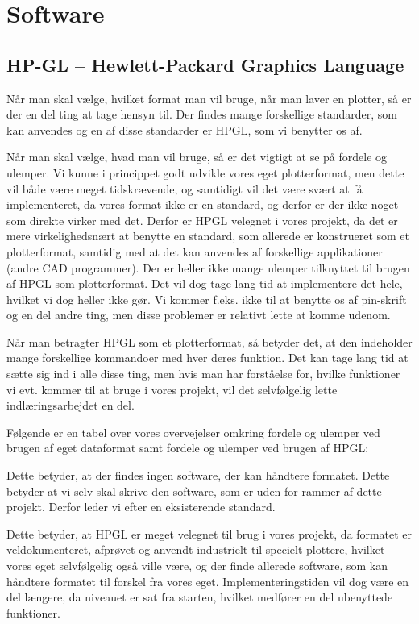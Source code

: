 \chapter{Software}


\section{HP-GL -- Hewlett-Packard Graphics Language}
Når man skal vælge, hvilket format man vil bruge, når man laver en plotter, så er der en del ting at tage hensyn til. Der findes mange forskellige standarder, som kan anvendes og en af disse standarder er HPGL, som vi benytter os af.


Når man skal vælge, hvad man vil bruge, så er det vigtigt at se på fordele og ulemper. Vi kunne i princippet godt udvikle vores eget plotterformat, men dette vil både være meget tidskrævende, og samtidigt vil det være svært at få implementeret, da vores format ikke er en standard, og derfor er der ikke noget som direkte virker med det. Derfor er HPGL velegnet i vores projekt, da det er mere virkelighedsnært at benytte en standard, som allerede er konstrueret som et plotterformat, samtidig med at det kan anvendes af forskellige applikationer (andre CAD programmer). Der er heller ikke mange ulemper tilknyttet til brugen af HPGL som plotterformat. Det vil dog tage lang tid at implementere det hele, hvilket vi dog heller ikke gør. Vi kommer f.eks. ikke til at benytte os af pin-skrift og en del andre ting, men disse problemer er relativt lette at komme udenom.


Når man betragter HPGL som et plotterformat, så betyder det, at den indeholder mange forskellige kommandoer med hver deres funktion. Det kan tage lang tid at sætte sig ind i alle disse ting, men hvis man har forståelse for, hvilke funktioner vi evt. kommer til at bruge i vores projekt, vil det selvfølgelig lette indlæringsarbejdet en del.


Følgende er en tabel over vores overvejelser omkring fordele og ulemper ved brugen af eget dataformat samt fordele og ulemper ved brugen af HPGL:


Dette betyder, at der findes ingen software, der kan håndtere formatet. Dette betyder at vi selv skal skrive den software, som er uden for rammer af dette projekt. Derfor leder vi efter en eksisterende standard.


Dette betyder, at HPGL er meget velegnet til brug i vores projekt, da formatet er veldokumenteret, afprøvet og anvendt industrielt til specielt plottere, hvilket vores eget selvfølgelig også ville være, og der finde allerede software, som kan håndtere formatet til forskel fra vores eget. Implementeringstiden vil dog være en del længere, da niveauet er sat fra starten, hvilket medfører en del ubenyttede funktioner.



